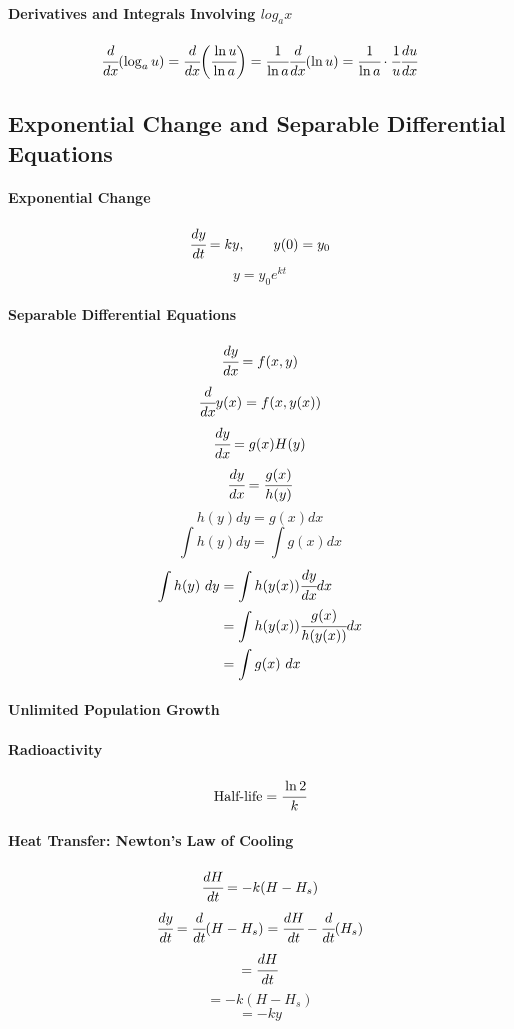 \documentclass{article}
\begin{document}
            \paragraph{Derivatives and Integrals Involving $log_a x$}
                \[\cfrac{d}{dx}(\log_a u)=\cfrac{d}{dx}\bigg(\cfrac{\ln u}{\ln a}\bigg)=\cfrac{1}{\ln a}\cfrac{d}{dx}(\ln u)=\cfrac{1}{\ln a}\cdot\cfrac{1}{u}\cfrac{du}{dx}\]
        \subsection{Exponential Change and Separable Differential Equations}
            \paragraph{Exponential Change}
                \[\cfrac{dy}{dt}=ky,\qquad y(0)=y_0\]
                \[y=y_0 e^{kt}\]
            \paragraph{Separable Differential Equations}
                \[\cfrac{dy}{dx}=f(x,y)\]
                \[\cfrac{d}{dx} y(x)=f(x,y(x))\]
                \[\cfrac{dy}{dx}=g(x)H(y)\]
                \[\cfrac{dy}{dx}=\cfrac{g(x)}{h(y)}\]
                \[h(y)dy=g(x)dx\]
                \[\int h(y) dy=\int g(x) dx\]
                \begin{equation}
                    \begin{aligned}
                        \int h(y)\ dy&=\int h(y(x))\cfrac{dy}{dx} dx\\
                        &=\int h(y(x))\cfrac{g(x)}{h(y(x))} dx\\
                        &=\int g(x)\ dx
                    \end{aligned}
                \end{equation}
            \paragraph{Unlimited Population Growth}
            \paragraph{Radioactivity}
            \[\text{Half-life}=\cfrac{\ln 2}{k}\]
            \paragraph{Heat Transfer: Newton's Law of Cooling}
            \[\cfrac{dH}{dt}=-k(H-H_s)\]
            \[\cfrac{dy}{dt}=\cfrac{d}{dt}(H-H_s)=\cfrac{dH}{dt}-\cfrac{d}{dt}(H_s)\]
            \[=\cfrac{dH}{dt}\]
            \[=-k(H-H_s)\]
            \[=-ky\]
\end{document}
